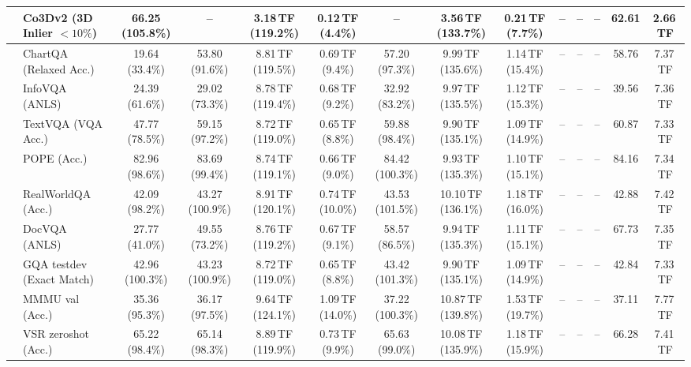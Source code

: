 \begin{table}[t]
\begin{center}
\begin{small}
\begin{sc}
{\begin{tabular}{llcccccccccccc}
& Co3Dv2 (3D Inlier $<10\%$) & 66.25 (105.8\%) & -- & 3.18\,TF (119.2\%) & 0.12\,TF (4.4\%) & -- & 3.56\,TF (133.7\%) & 0.21\,TF (7.7\%) & -- & -- & -- & 62.61 & 2.66\,TF \\
\midrule\midrule
{}
& ChartQA (Relaxed Acc.) & 19.64 (33.4\%) & 53.80 (91.6\%) & 8.81\,TF (119.5\%) & 0.69\,TF (9.4\%) & 57.20 (97.3\%) & 9.99\,TF (135.6\%) & 1.14\,TF (15.4\%) & -- & -- & -- & 58.76 & 7.37\,TF \\
& InfoVQA (ANLS) & 24.39 (61.6\%) & 29.02 (73.3\%) & 8.78\,TF (119.4\%) & 0.68\,TF (9.2\%) & 32.92 (83.2\%) & 9.97\,TF (135.5\%) & 1.12\,TF (15.3\%) & -- & -- & -- & 39.56 & 7.36\,TF \\
& TextVQA (VQA Acc.) & 47.77 (78.5\%) & 59.15 (97.2\%) & 8.72\,TF (119.0\%) & 0.65\,TF (8.8\%) & 59.88 (98.4\%) & 9.90\,TF (135.1\%) & 1.09\,TF (14.9\%) & -- & -- & -- & 60.87 & 7.33\,TF \\
& POPE (Acc.) & 82.96 (98.6\%) & 83.69 (99.4\%) & 8.74\,TF (119.1\%) & 0.66\,TF (9.0\%) & 84.42 (100.3\%) & 9.93\,TF (135.3\%) & 1.10\,TF (15.1\%) & -- & -- & -- & 84.16 & 7.34\,TF \\
& RealWorldQA (Acc.) & 42.09 (98.2\%) & 43.27 (100.9\%) & 8.91\,TF (120.1\%) & 0.74\,TF (10.0\%) & 43.53 (101.5\%) & 10.10\,TF (136.1\%) & 1.18\,TF (16.0\%) & -- & -- & -- & 42.88 & 7.42\,TF \\
& DocVQA (ANLS) & 27.77 (41.0\%) & 49.55 (73.2\%) & 8.76\,TF (119.2\%) & 0.67\,TF (9.1\%) & 58.57 (86.5\%) & 9.94\,TF (135.3\%) & 1.11\,TF (15.1\%) & -- & -- & -- & 67.73 & 7.35\,TF \\
& GQA testdev (Exact Match) & 42.96 (100.3\%) & 43.23 (100.9\%) & 8.72\,TF (119.0\%) & 0.65\,TF (8.8\%) & 43.42 (101.3\%) & 9.90\,TF (135.1\%) & 1.09\,TF (14.9\%) & -- & -- & -- & 42.84 & 7.33\,TF \\
& MMMU val (Acc.) & 35.36 (95.3\%) & 36.17 (97.5\%) & 9.64\,TF (124.1\%) & 1.09\,TF (14.0\%) & 37.22 (100.3\%) & 10.87\,TF (139.8\%) & 1.53\,TF (19.7\%) & -- & -- & -- & 37.11 & 7.77\,TF \\
& VSR zeroshot (Acc.) & 65.22 (98.4\%) & 65.14 (98.3\%) & 8.89\,TF (119.9\%) & 0.73\,TF (9.9\%) & 65.63 (99.0\%) & 10.08\,TF (135.9\%) & 1.18\,TF (15.9\%) & -- & -- & -- & 66.28 & 7.41\,TF \\
\midrule

\end{tabular}}
\end{sc}
\end{small}
\end{center}
\end{table}
